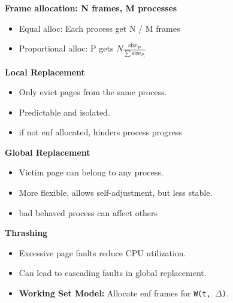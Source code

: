 \documentclass[8pt,twocolumn]{article}
\begin{document}
\vspace{-1.0em}
\textbf{Frame allocation: N frames, M processes}
\vspace{-0.6em}
\begin{itemize}
  \setlength{\itemsep}{0pt} %
  \setlength{\parskip}{0pt}
  \item Equal alloc: Each process get N / M frames
  \item Proportional alloc: P gets $N\frac{\text{size}_P}{\sum \text{size}_{P_i}}$
\end{itemize}
\vspace{-0.8em}
\textbf{Local Replacement}
\vspace{-0.6em}
\begin{itemize}
    \setlength{\itemsep}{0pt} %
    \setlength{\parskip}{0pt}
  \item Only evict pages from the same process.
  \item Predictable and isolated.
  \item if not enf allocated, hinders process progress
\end{itemize}
\vspace{-0.6em}
\textbf{Global Replacement}
\vspace{-0.6em}
\begin{itemize}
    \setlength{\itemsep}{0pt} %
    \setlength{\parskip}{0pt}
  \item Victim page can belong to any process.
  \item More flexible, allows self-adjustment, but less stable.
  \item bad behaved process can affect others
\end{itemize}
\vspace{-0.6em}
\textbf{Thrashing}
\vspace{-0.6em}
\begin{itemize}
    \setlength{\itemsep}{0pt} %
    \setlength{\parskip}{0pt}
  \item Excessive page faults reduce CPU utilization.
  \item Can lead to cascading faults in global replacement.
  \item \textbf{Working Set Model:} Allocate enf frames for \texttt{W(t, $\Delta$)}.
\end{itemize}
\end{document}
